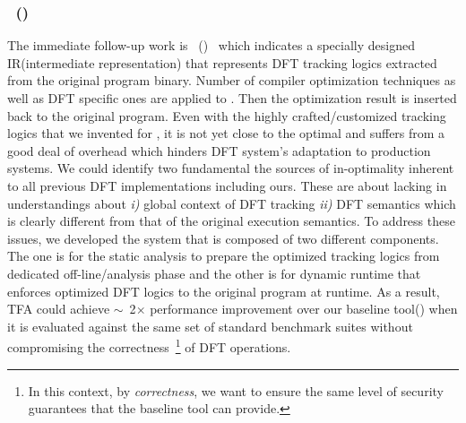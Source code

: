 \documentclass[letterpaper, 10pt]{article}
\begin{document}
\begin{small}
\subsubsection*{\TFAFull~(\TFA)}
The immediate follow-up work is \TFAFull~(\TFA)~\cite{tfa:2012ndss} which
indicates a specially designed IR(intermediate representation) that represents
DFT tracking logics extracted from the original program binary.  Number of
compiler optimization techniques as well as DFT specific ones are applied to
\TFA. Then the optimization result is inserted back to the original program. 
%
Even with the highly crafted/customized tracking logics that we invented for
\libdft, it is not yet close to the optimal and suffers from a good deal of
overhead which hinders DFT system's adaptation to production systems. We could
identify two fundamental the sources of in-optimality inherent to all
previous DFT implementations including ours. These are about lacking in
understandings about {\it i)} global context of DFT tracking {\it ii)} DFT
semantics which is clearly different from that of the original execution
semantics.
%
To address these issues, we developed the system that is composed of two
different components. The one is for the static analysis to prepare the
optimized tracking logics from dedicated off-line/analysis phase and the other
is for dynamic runtime that enforces optimized DFT logics to the original
program  at runtime.
%
As a result, TFA could achieve \(\sim\)~2\(\times\) performance improvement
over  our baseline tool(\libdft) when it is evaluated against the same set of
standard benchmark suites without compromising the correctness~\footnote{In
        this context, by {\it correctness}, we want to ensure the same level of
security guarantees that the baseline tool \libdft can provide.} of DFT
operations.


\end{small}
\end{document}
